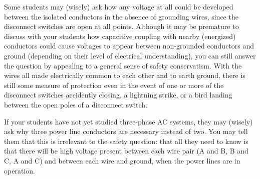 Some students may (wisely) ask how any voltage at all could be developed between the isolated conductors in the absence of grounding wires, since the disconnect switches are open at all points.  Although it may be premature to discuss with your students how capacitive coupling with nearby (energized) conductors could cause voltages to appear between non-grounded conductors and ground (depending on their level of electrical understanding), you can still answer the question by appealing to a general sense of safety conservatism.  With the wires all made electrically common to each other and to earth ground, there is still some measure of protection even in the event of one or more of the disconnect switches accidently closing, a lightning strike, or a bird landing between the open poles of a disconnect switch.

If your students have not yet studied three-phase AC systems, they may (wisely) ask why three power line conductors are necessary instead of two.  You may tell them that this is irrelevant to the safety question: that all they need to know is that there will be high voltage present between each wire pair (A and B, B and C, A and C) and between each wire and ground, when the power lines are in operation.




